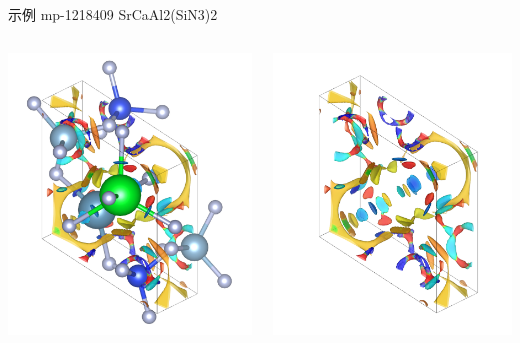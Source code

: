 \documentclass{beamer}
\begin{document}
\begin{frame}{示例 mp-1218409 SrCaAl2(SiN3)2}
    \begin{columns}[T] %
        \begin{column}{0.5\textwidth}
            \includegraphics[scale=0.3]{1}
        \end{column}
        \begin{column}{0.5\textwidth}
            \includegraphics[scale=0.3]{2}

\end{column}
\end{columns}
\end{frame}
\end{document}
